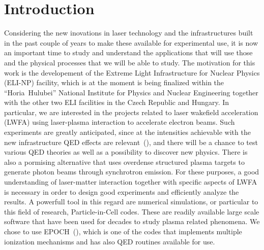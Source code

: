 \documentclass[12pt, class=report, crop=false]{standalone}
\begin{document}
\chapter*{Introduction}%
\label{chap:intro}

Considering the new inovations in laser technology and the infrastructures built in the past couple of years to make these available for experimental use, it is now an important time to study and understand the applications that will use those and the physical processes that we will be able to study. The motivation for this work is the developement of the Extreme Light Infrastructure for Nuclear Physics (ELI-NP) facility, which is at the moment is being finalized within the ``Horia~Hulubei'' National Institute for Physics and Nuclear Engineering together with the other two ELI facilities in the Czech Republic and Hungary. In particular, we are interested in the projects related to laser wakefield acceleration (LWFA) using laser-plasma interaction to accelerate electron beams. Such experiments are greatly anticipated, since at the intensities achievable with the new infrastructure QED effects are relevant~(\cite{tanakaCurrentStatusHighlights2020}), and there will be a chance to test various QED theories as well as a possibility to discover new physics. There is also a pormising alternative that uses overdense structured plasma targets to generate photon beams through synchrotron emission. For these purposes, a good understanding of laser-matter interaction together with specific aspects of LWFA is necessary in order to design good experiments and efficiently analyze the results. A powerfull tool in this regard are numerical simulations, or particular to this field of research, Particle-in-Cell codes. These are readily available large scale software that have been used for decades to study plasma related phenomena. We chose to use EPOCH~(\cite{arberContemporaryParticleincellApproach2015}), which is one of the codes that implements multiple ionization mechanisms and has also QED routines available for use.
\end{document}

